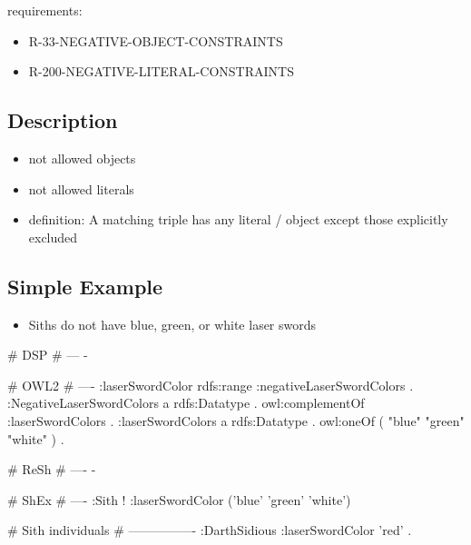 \documentclass{llncs}
\begin{document}
requirements:

\begin{itemize}
	\item R-33-NEGATIVE-OBJECT-CONSTRAINTS
	\item R-200-NEGATIVE-LITERAL-CONSTRAINTS
\end{itemize}

\subsection{Description}

\begin{itemize}
	\item not allowed objects
	\item not allowed literals
	\item definition: A matching triple has any literal / object except those explicitly excluded
\end{itemize}

\subsection{Simple Example}

\begin{itemize}
	\item Siths do not have blue, green, or white laser swords
\end{itemize}

\begin{ex}
# DSP
# ---
-
\end{ex}

\begin{ex}
# OWL2
# ----
:laserSwordColor rdfs:range :negativeLaserSwordColors . 
:NegativeLaserSwordColors
    a rdfs:Datatype .
    owl:complementOf :laserSwordColors .
:laserSwordColors
    a rdfs:Datatype .
    owl:oneOf ( "blue" "green" "white" ) .
\end{ex}

\begin{ex}
# ReSh
# ----
-
\end{ex}

\begin{ex}
# ShEx
# ----
:Sith {
    ! :laserSwordColor ('blue' 'green' 'white') }
\end{ex}

\begin{ex}
# Sith individuals
# ----------------
:DarthSidious
    :laserSwordColor 'red' .
\end{ex}
\end{document}
